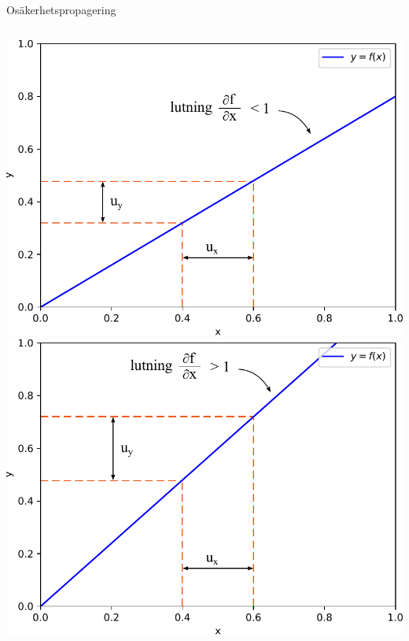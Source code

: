 \documentclass[9pt]{beamer}
\begin{document}
\begin{frame}{Osäkerhetspropagering}
        \begin{columns}[T]
                \includegraphics[width=\textwidth]{Fig_1_new.pdf}\\
                \includegraphics[width=\textwidth]{Fig_2_new.pdf}\\
        \end{columns}
    \end{frame}
\end{document}
